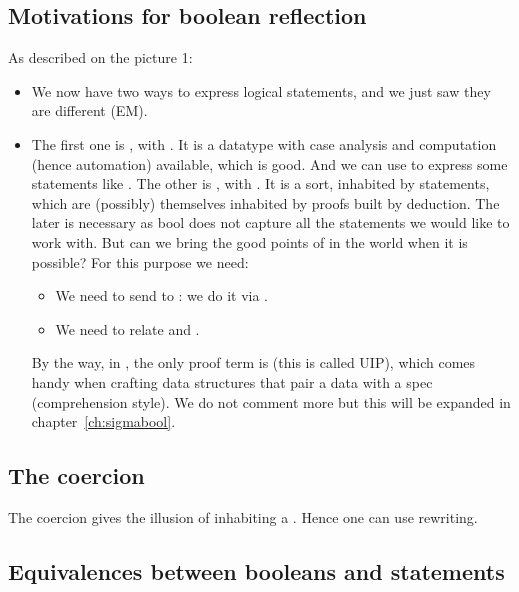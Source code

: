 \subsection{Motivations for boolean reflection}

As described on the picture 1:
\begin{itemize}
\item We now have two ways to express logical statements, and we just
  saw they are different (EM).
\item The first one is ,
  with .
  It is a datatype with case analysis and computation (hence automation)
  available, which is good. And we can use  to express some
  statements like . The other is , with
  . It is a sort, inhabited by statements, which are
  (possibly) themselves inhabited by proofs built by deduction. The
  later is necessary as bool does not capture all the statements we
  would like to work with. But can we bring the good points of
   in the  world when it is possible? For this purpose
  we need:
  \begin{itemize}
    \item We need to send  to : we do it via
      .
    \item We need to relate \C{&&} and \C{/\\}.
  \end{itemize}
  By the way, in , the only proof term is  (this
  is called UIP), which comes handy when crafting data structures that
  pair a data with a spec (comprehension style). We do not comment
  more but this will be expanded in chapter~\ref{ch:sigmabool}.
\end{itemize}

\subsection{The  coercion}

The  coercion gives the illusion of inhabiting a .
Hence one can use rewriting.

\subsection{Equivalences between booleans and  statements}

